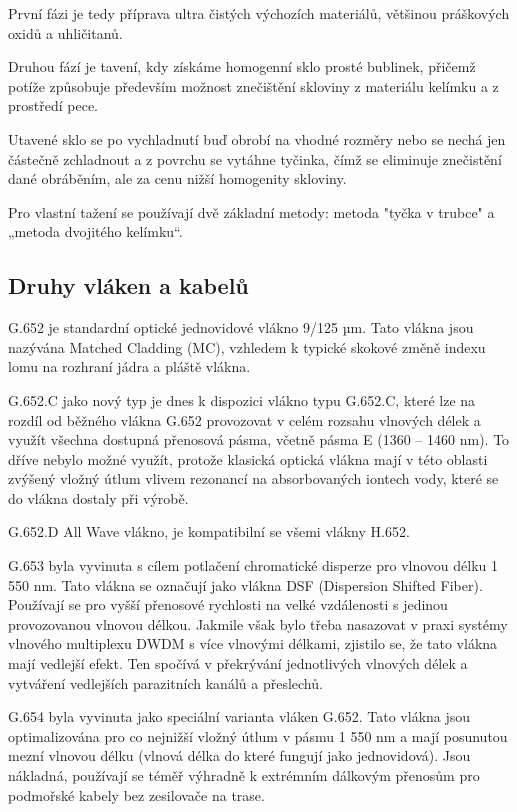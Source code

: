 První fázi je tedy příprava ultra čistých výchozích materiálů, většinou práškových oxidů a uhličitanů.

Druhou fází je tavení, kdy získáme homogenní sklo prosté bublinek, přičemž potíže způsobuje především možnost znečištění skloviny z materiálu kelímku a z prostředí pece.

Utavené sklo se po vychladnutí buď obrobí na vhodné rozměry nebo se nechá jen částečně zchladnout a z povrchu se vytáhne tyčinka, čímž se eliminuje znečistění dané obráběním, ale za cenu nižší homogenity skloviny.

Pro vlastní tažení se používají dvě základní metody: metoda "tyčka v trubce" a „metoda dvojitého kelímku“. 

\subsection{Druhy vláken a kabelů}
G.652 je standardní optické jednovidové vlákno 9/125 µm. Tato vlákna jsou nazývána Matched Cladding (MC), vzhledem k typické skokové změně indexu lomu na rozhraní jádra a pláště vlákna. 

G.652.C jako nový typ je dnes k dispozici vlákno typu G.652.C, které lze na rozdíl od běžného vlákna G.652 provozovat v celém rozsahu vlnových délek a využít všechna dostupná přenosová pásma, včetně pásma E (1360 – 1460 nm). To dříve nebylo
možné využít, protože klasická optická vlákna mají v této oblasti zvýšený vložný útlum vlivem rezonancí na absorbovaných iontech vody, které se do vlákna dostaly při výrobě.

G.652.D All Wave vlákno, je kompatibilní se všemi vlákny H.652.

G.653 byla vyvinuta s cílem potlačení chromatické disperze pro vlnovou délku 1 550 nm. Tato vlákna se označují jako vlákna DSF (Dispersion Shifted Fiber). Používají se pro vyšší přenosové rychlosti na velké vzdálenosti s jedinou provozovanou vlnovou délkou. Jakmile však bylo třeba nasazovat v praxi systémy vlnového multiplexu DWDM s více vlnovými délkami, zjistilo se, že tato vlákna mají vedlejší efekt. Ten spočívá v překrývání jednotlivých vlnových délek a vytváření vedlejších parazitních kanálů
a přeslechů.

G.654 byla vyvinuta jako speciální varianta vláken G.652. Tato vlákna jsou optimalizována pro co nejnižší vložný útlum v pásmu 1 550 nm a mají posunutou mezní vlnovou délku (vlnová délka do které fungují jako jednovidová). Jsou nákladná, používají se téměř výhradně k extrémním dálkovým přenosům pro podmořské kabely bez zesilovače na trase.


